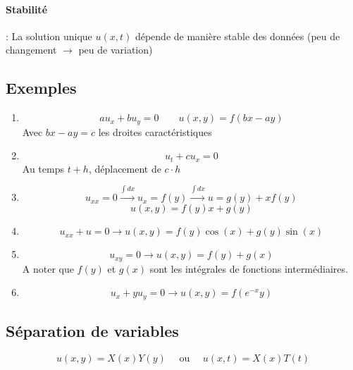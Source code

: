\documentclass[resume]{subfiles}
\begin{document}
\paragraph{Stabilité} : La solution unique $u(x,t)$ dépende de manière stable des données (peu de changement $\to$ peu de variation)
\subsection{Exemples}
\begin{enumerate}
\item 
$$au_x+bu_y=0\qquad u(x,y)=f(bx-ay)$$
Avec $bx-ay=c$ les droites caractéristiques
\item 
$$u_t+cu_x=0$$
Au temps $t+h$, déplacement de $c\cdot h$
\item 
$$u_{xx}=0\xrightarrow{\int dx} u_x=f(y)\xrightarrow{\int dx} u=g(y)+xf(y)$$
$$u(x,y)=f(y)x+g(y)$$
\item \begin{small}$$u_{xx}+u=0\rightarrow u(x,y)=f(y)\cos(x)+g(y)\sin(x)$$\end{small}
\item $$u_{xy}=0\longrightarrow u(x,y)=f(y)+g(x)$$
A noter que $f(y)$ et $g(x)$ sont les intégrales de fonctions intermédiaires.
\item $$u_x+yu_y=0\longrightarrow u(x,y)=f(e^{-x}y)$$
\end{enumerate}
\subsection{Séparation de variables}
$$u(x,y)=X(x)Y(y)\quad \text{ ou }\quad u(x,t)=X(x)T(t)$$
\end{document}
